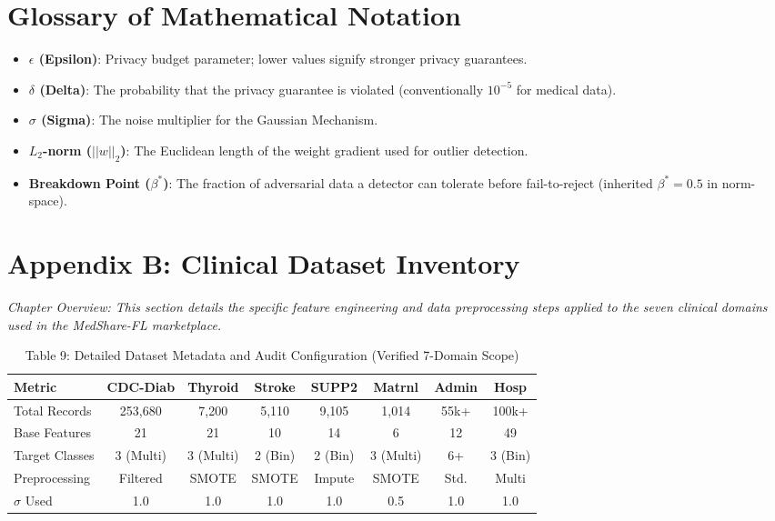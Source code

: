 \documentclass[10pt, a4paper, twocolumn]{article}
\begin{document}
\section*{Glossary of Mathematical Notation}
\begin{itemize}
    \item \textbf{$\epsilon$ (Epsilon)}: Privacy budget parameter; lower values signify stronger privacy guarantees.
    \item \textbf{$\delta$ (Delta)}: The probability that the privacy guarantee is violated (conventionally $10^{-5}$ for medical data).
    \item \textbf{$\sigma$ (Sigma)}: The noise multiplier for the Gaussian Mechanism.
    \item \textbf{$L_2$-norm ($||w||_2$)}: The Euclidean length of the weight gradient used for outlier detection.
    \item \textbf{Breakdown Point ($\beta^*$)}: The fraction of adversarial data a detector can tolerate before fail-to-reject (inherited $\beta^*=0.5$ in norm-space).
\end{itemize}

\section*{Appendix B: Clinical Dataset Inventory}

\textit{Chapter Overview: This section details the specific feature engineering and data preprocessing steps applied to the seven clinical domains \cite{cdc2015, uci-thyroid, knaus1995, stroke2022} used in the MedShare-FL marketplace.}

\begin{table}[hbt!]
\centering
\scriptsize
\begin{tabular}{lccccccc}
\toprule
\textbf{Metric} & \textbf{CDC-Diab} & \textbf{Thyroid} & \textbf{Stroke} & \textbf{SUPP2} & \textbf{Matrnl} & \textbf{Admin} & \textbf{Hosp} \\
\midrule
Total Records & 253,680 & 7,200 & 5,110 & 9,105 & 1,014 & 55k+ & 100k+ \\
Base Features & 21 & 21 & 10 & 14 & 6 & 12 & 49 \\
Target Classes & 3 (Multi) & 3 (Multi) & 2 (Bin) & 2 (Bin) & 3 (Multi) & 6+ & 3 (Bin) \\
Preprocessing & Filtered & SMOTE & SMOTE & Impute & SMOTE & Std. & Multi \\
$\sigma$ Used & 1.0 & 1.0 & 1.0 & 1.0 & 0.5 & 1.0 & 1.0 \\
\bottomrule
\end{tabular}
\caption{Table 9: Detailed Dataset Metadata and Audit Configuration (Verified 7-Domain Scope)}
\end{table}
\end{document}
